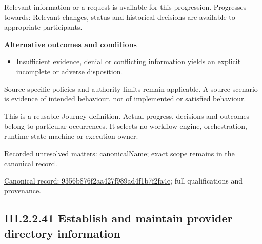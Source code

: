 Relevant information or a request is available for this progression. Progresses towards: Relevant changes, status and historical decisions are available to appropriate participants.



\par\medskip\textbf{Alternative outcomes and conditions}\par


\begin{itemize}


\item Insufficient evidence, denial or conflicting information yields an explicit incomplete or adverse disposition.

\end{itemize}


Source-specific policies and authority limits remain applicable. A source scenario is evidence of intended behaviour, not of implemented or satisfied behaviour.



This is a reusable Journey definition. Actual progress, decisions and outcomes belong to particular occurrences. It selects no workflow engine, orchestration, runtime state machine or execution owner.


{\small Recorded unresolved matters: canonicalName; exact scope remains in the canonical record.}\par
{\footnotesize \href{../../../../../../../continuum/strategy/value-stream/9356b876f2aa427f989ad4f1b7f2fa4c.md}{Canonical record: 9356b876f2aa427f989ad4f1b7f2fa4c}; full qualifications and provenance.}\par
\subsection*{III.2.2.41 Establish and maintain provider directory information}
\label{navigation:III.2.2.41}

